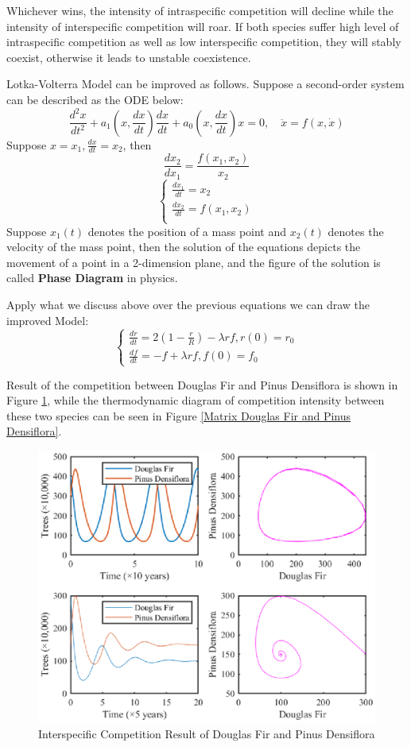 \documentclass{mcmthesis}
\numberwithin{figure}{section}
\numberwithin{table}{section}
\numberwithin{equation}{section}
\begin{document}
Whichever wins, the intensity of intraspecific competition will decline while the
intensity of interspecific competition will roar. If both species suffer high level of
intraspecific competition as well as low interspecific competition, they will stably
coexist, otherwise it leads to unstable coexistence. 
\par
Lotka-Volterra Model can be improved as follows. Suppose a second-order system can be described as the ODE below:
$$
  \frac{d^2x}{dt^2}+a_1(x,\frac{dx}{dt})\frac{dx}{dt} + a_0(x,\frac{dx}{dt})x = 0, \quad \ddot{x} = f(x,\dot{x})
$$  
Suppose $ x = x_1, \frac{dx}{dt} = x_2 $, then
$$
  \frac{dx_2}{dx_1} = \frac{f(x_1,x_2)}{x_2}
$$ 
$$
\begin{cases}
        \frac{dx_1}{dt} = x_2\\
      \frac{dx_2}{dt} =f(x_1,x_2)\\
\end{cases}
$$ 
Suppose $ x_1(t) $ denotes the position of a mass point and $ x_2(t) $ denotes the velocity of the mass point, then the 
solution of the equations depicts the movement of a point in a 2-dimension plane, and the figure of the solution is called
\textbf{Phase Diagram} in physics.
\par
Apply what we discuss above over the previous equations we can draw the improved Model:
$$
  \begin{cases}
    \frac{dr}{dt} = 2(1-\frac{r}{R})-\lambda rf, r(0) = r_0\\
    \frac{df}{dt} = -f + \lambda rf, f(0) = f_0
  \end{cases}
$$ 
\par
Result of the competition between Douglas Fir and Pinus Densiflora is shown in 
Figure \ref{Douglas Fir and Pinus Densiflora result}, while the thermodynamic diagram
of competition intensity between these two species can be seen in Figure \ref{Matrix Douglas Fir and Pinus Densiflora}.

\begin{figure}[htbp]
  \centering
  \includegraphics[width = 14cm]{code&pic/Interspecies.eps}
  \caption{Interspecific Competition Result of Douglas Fir and Pinus Densiflora}\label{Douglas Fir and Pinus Densiflora result}
\end{figure}
\end{document}
